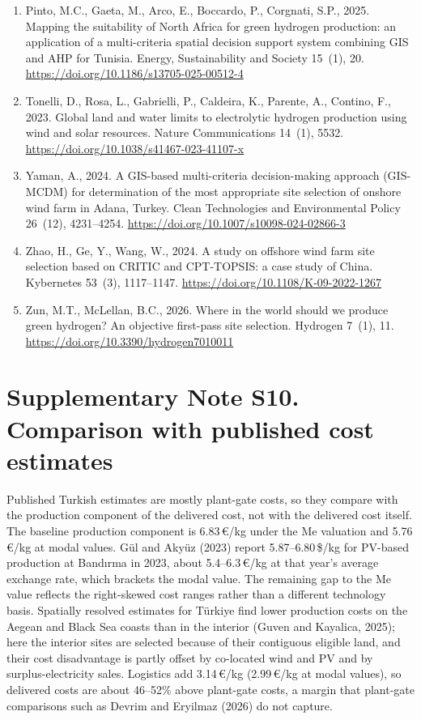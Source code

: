 \documentclass[11pt,a4paper]{article}
\begin{document}
\begin{enumerate}
\item Pinto, M.C., Gaeta, M., Arco, E., Boccardo, P., Corgnati, S.P., 2025. Mapping the suitability of North Africa for green hydrogen production: an application of a multi-criteria spatial decision support system combining GIS and AHP for Tunisia. Energy, Sustainability and Society 15~(1), 20. \url{https://doi.org/10.1186/s13705-025-00512-4}
\item Tonelli, D., Rosa, L., Gabrielli, P., Caldeira, K., Parente, A., Contino, F., 2023. Global land and water limits to electrolytic hydrogen production using wind and solar resources. Nature Communications 14~(1), 5532. \url{https://doi.org/10.1038/s41467-023-41107-x}
\item Yaman, A., 2024. A GIS-based multi-criteria decision-making approach (GIS-MCDM) for determination of the most appropriate site selection of onshore wind farm in Adana, Turkey. Clean Technologies and Environmental Policy 26~(12), 4231--4254. \url{https://doi.org/10.1007/s10098-024-02866-3}
\item Zhao, H., Ge, Y., Wang, W., 2024. A study on offshore wind farm site selection based on CRITIC and CPT-TOPSIS: a case study of China. Kybernetes 53~(3), 1117--1147. \url{https://doi.org/10.1108/K-09-2022-1267}
\item Zun, M.T., McLellan, B.C., 2026. Where in the world should we produce green hydrogen? An objective first-pass site selection. Hydrogen 7~(1), 11. \url{https://doi.org/10.3390/hydrogen7010011}
\end{enumerate}


\newpage\section{Supplementary Note S10. Comparison with published cost estimates}

Published Turkish estimates are mostly plant-gate costs, so they compare with the production component of the delivered cost, not with the delivered cost itself. The baseline production component is 6.83\,€/kg under the Me valuation and 5.76\,€/kg at modal values. G{\"u}l and Aky{\"u}z (2023) report 5.87--6.80\,\$/kg for PV-based production at Bandırma in 2023, about 5.4--6.3\,€/kg at that year's average exchange rate, which brackets the modal value. The remaining gap to the Me value reflects the right-skewed cost ranges rather than a different technology basis. Spatially resolved estimates for Türkiye find lower production costs on the Aegean and Black Sea coasts than in the interior (Guven and Kayalica, 2025); here the interior sites are selected because of their contiguous eligible land, and their cost disadvantage is partly offset by co-located wind and PV and by surplus-electricity sales. Logistics add 3.14\,€/kg (2.99\,€/kg at modal values), so delivered costs are about 46--52\% above plant-gate costs, a margin that plant-gate comparisons such as Devrim and Eryilmaz (2026) do not capture.
\end{document}
